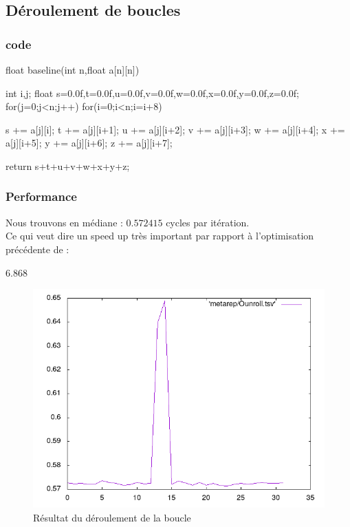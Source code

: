 \documentclass{report}
\begin{document}
  \subsection{Déroulement de boucles}
  \subsubsection{code}
  \begin{cc}
    float baseline(int n,float a[n][n])
    {
        int i,j;
        float s=0.0f,t=0.0f,u=0.0f,v=0.0f,w=0.0f,x=0.0f,y=0.0f,z=0.0f;
        for(j=0;j<n;j++)
        for(i=0;i<n;i=i+8)
        {
              s += a[j][i];
              t += a[j][i+1];
              u += a[j][i+2];
              v += a[j][i+3];
              w += a[j][i+4];
              x += a[j][i+5];
              y += a[j][i+6];
              z += a[j][i+7];

        }

        return s+t+u+v+w+x+y+z;
    }
  \end{cc}
  \subsubsection{Performance}
  Nous trouvons en médiane : $0.572415$ cycles par itération.\\
  Ce qui veut dire un speed up très important par rapport à l'optimisation précédente de :
  \begin{center}
      $6.868$
  \end{center}
  \begin{figure}[ht!]
    \centering
    \includegraphics[scale=0.45]{../metarep/Ounroll.png}
    \caption{Résultat du déroulement de la boucle}
  \end{figure}
\end{document}
